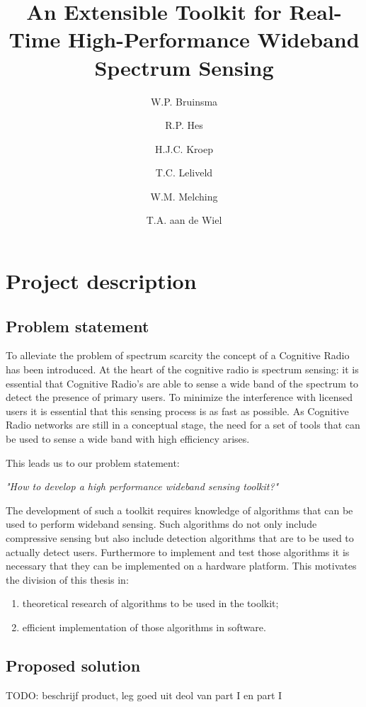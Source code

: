 \documentclass[a4paper, openany, oneside]{memoir}
\title{An Extensible Toolkit for Real-Time High-Performance Wideband Spectrum Sensing}
\author{W.P. Bruinsma \and R.P. Hes \and H.J.C. Kroep \and T.C. Leliveld \and W.M. Melching \and T.A. aan de Wiel}
\begin{document}
\chapter{Project description} \label{cha:problem_statement}
\section{Problem statement}

To alleviate the problem of spectrum scarcity the concept of a Cognitive Radio has been introduced.
At the heart of the cognitive radio is spectrum sensing: it is essential that Cognitive Radio's are able to sense a wide band of the spectrum to detect the presence of primary users. To minimize the interference with licensed users it is essential that this sensing process is as fast as possible. As Cognitive Radio networks are still in a conceptual stage, the need for a set of tools that can be used to sense a wide band with high efficiency arises.

This leads us to our problem statement:
\begin{center}
\emph{"How to develop a high performance wideband sensing toolkit?"}
\end{center}

The development of such a toolkit requires knowledge of algorithms that can be used to perform wideband sensing. Such algorithms do not only include compressive sensing but also include detection algorithms that are to be used to actually detect users. Furthermore to implement and test those algorithms it is necessary that they can be implemented on a hardware platform. This motivates the division of this thesis in:

\begin{enumerate}
	\item theoretical research of algorithms to be used in the toolkit;
	\item efficient implementation of those algorithms in software.
\end{enumerate}

\section{Proposed solution}

TODO: beschrijf product, leg goed uit deol van part I en part I
\end{document}
